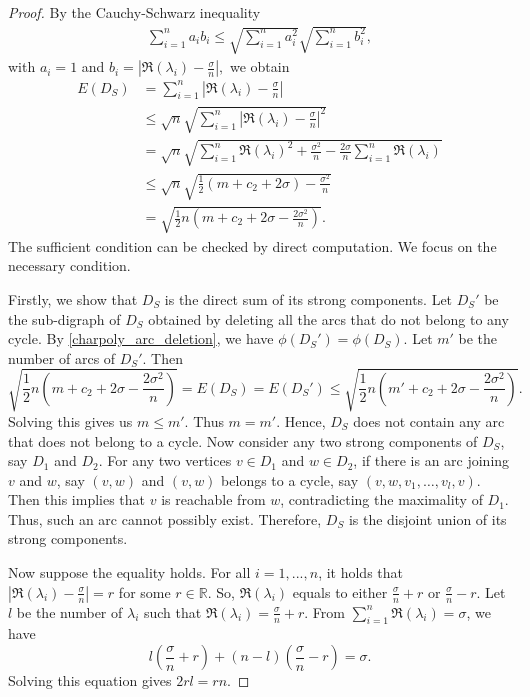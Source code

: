 \documentclass[12pt,a4paper,reqno]{amsart}
\numberwithin{equation}{section}
\theoremstyle{plain}
\theoremstyle{definition}
\newcommand{\<}{\langle}
\renewcommand{\>}{\rangle}
\begin{document}
\begin{proof}
    By the Cauchy-Schwarz inequality 
    \begin{align*}
         \sum_{i=1}^n a_ib_i \leq \sqrt{\sum_{i=1}^n a_i^2} \sqrt{\sum_{i=1}^n b_i^2},
    \end{align*}
    with $a_i=1$ and $b_i= \left | \Re(\lambda_i)-\frac{\sigma}{n} \right|,$ we obtain
	\begin{align*}    
		E(D_S)
		&= \sum_{i=1}^n \left | \Re(\lambda_i)-\frac{\sigma}{n} \right| \\          
		&\leq \sqrt{n} \sqrt{\sum_{i=1}^n \left | \Re(\lambda_i)-\frac{\sigma}{n} \right|^2} \\      
		&= \sqrt{n} \sqrt{\sum_{i=1}^n \Re(\lambda_i)^2+\frac{\sigma^2}{n}-\frac{2\sigma}{n} \sum_{i=1}^n \Re(\lambda_i)} \\
		&\leq \sqrt{n} \sqrt{ \frac{1}{2}(m+c_2+2\sigma)-\frac{\sigma^2}{n} } \\
		&= \sqrt{ \frac{1}{2}n \left ( m+c_2+ 2\sigma-\frac{2\sigma^2}{n} \right) }.         
	\end{align*}    
    The sufficient condition can be checked by direct computation. We focus on the necessary condition. 

    Firstly, we show that $D_S$ is the direct sum of its strong components. Let $D_S'$ be the sub-digraph of $D_S$ obtained by deleting all the arcs that do not belong to any cycle. By \ref{charpoly_arc_deletion}, we have $\phi(D_S')=\phi(D_S)$. Let $m'$ be the number of arcs of $D_S'$. Then
    \begin{equation*}
        \sqrt{ \frac{1}{2}n \left ( m+c_2+ 2\sigma-\frac{2\sigma^2}{n} \right)}=E(D_S)=E(D_S') \leq \sqrt{ \frac{1}{2}n \left ( m'+c_2+ 2\sigma-\frac{2\sigma^2}{n} \right)}.
    \end{equation*} 
    Solving this gives us $m \leq m'$. Thus $m=m'$. Hence, $D_S$ does not contain any arc that does not belong to a cycle. Now consider any two strong components of $D_S$, say $D_1$ and $D_2$. For any two vertices $v\in D_1$ and $w\in D_2$, if there is an arc joining $v$ and $w$, say $(v,w)$ and $(v,w)$ belongs to a cycle, say $(v,w,v_1, \dots, v_{l},v)$. Then this implies that $v$ is reachable from $w$, contradicting the maximality of $D_1$. Thus, such an arc cannot possibly exist. %
    Therefore, $D_S$ is the disjoint union of its strong components.
   
    Now suppose the equality holds. For all $i=1,...,n$, it holds that $\left | \Re(\lambda_i)-\frac{\sigma}{n} \right|=r$ for some $r\in \mathbb{R}$. So, $\Re(\lambda_i)$ equals to either $\frac{\sigma}{n}+r$ or $\frac{\sigma}{n}-r$. Let $l$ be the number of $\lambda_i$ such that $\Re(\lambda_i)=\frac{\sigma}{n}+r$. From $\sum_{i=1}^n \Re(\lambda_i)=\sigma$, we have 
    \[
    l\left( \frac{\sigma}{n}+r \right) + (n-l) \left( \frac{\sigma}{n}-r \right) = \sigma.
    \]
    Solving this equation gives $2rl = rn.$
	

\end{proof}
\end{document}
